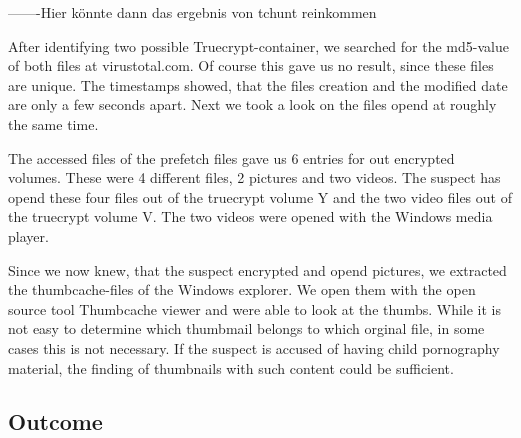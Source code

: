 -------Hier könnte dann das ergebnis von tchunt reinkommen

After identifying two possible Truecrypt-container, we searched for the md5-value of both files at virustotal.com. Of course this gave us no result, since these files are unique. The timestamps showed, that the files creation and the modified date are only a few seconds apart. Next we took a look on the files opend at roughly the same time. 

The accessed files of the prefetch files gave us 6 entries for out encrypted volumes. These were 4 different files, 2 pictures and two videos.
The suspect has opend these four files out of the truecrypt volume Y and the two video files out of the truecrypt volume V. The two videos were opened with the Windows media player.

Since we now knew, that the suspect encrypted and opend pictures, we extracted the thumbcache-files of the Windows explorer. We open them with the open source tool Thumbcache viewer and were able to look at the thumbs. While it is not easy to determine which thumbmail belongs to which orginal file, in some cases this is not necessary. If the suspect is accused of having child pornography material, the finding of thumbnails with such content could be sufficient.


\subsection{Outcome}

